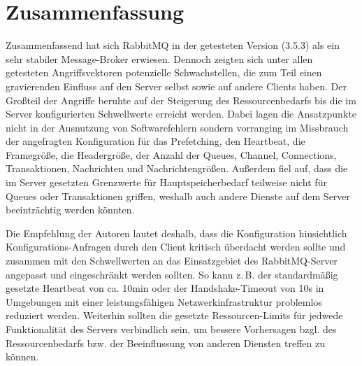 \documentclass[	a4paper,
			11pt,
			oneside,
			parskip]{scrartcl}
\begin{document}
\clearpage
\section*{Zusammenfassung}

	Zusammenfassend hat sich RabbitMQ in der getesteten Version (3.5.3) als ein sehr stabiler Message-Broker erwiesen. Dennoch zeigten sich unter allen getesteten Angriffsvektoren potenzielle Schwachstellen,
	die zum Teil einen gravierenden Einfluss auf den Server selbst sowie auf andere Clients haben. Der Großteil der Angriffe beruhte auf der Steigerung des Ressourcenbedarfs bis die im Server konfigurierten
	Schwellwerte erreicht werden. Dabei lagen die Ansatzpunkte nicht in der Ausnutzung von Softwarefehlern sondern vorranging im Missbrauch der angefragten Konfiguration für das Prefetching, den Heartbeat,
	die Framegröße, die Headergröße, der Anzahl der Queues, Channel, Connections, Transaktionen, Nachrichten und Nachrichtengrößen. Außerdem fiel auf, dass die im Server gesetzten Grenzwerte für Hauptspeicherbedarf teilweise nicht für Queues oder Transaktionen griffen, weshalb auch andere Dienste auf dem Server beeinträchtig werden könnten.
	
	Die Empfehlung der Autoren lautet deshalb, dass die Konfiguration hinsichtlich Konfigurations-Anfragen durch den Client kritisch überdacht werden sollte und zusammen mit den Schwellwerten an das 
	Einsatzgebiet des RabbitMQ-Server angepasst und eingeschränkt werden sollten. So kann z.\,B. der standardmäßig gesetzte Heartbeat von ca. 10min oder der Handshake-Timeout von 10s in Umgebungen
	mit einer leistungsfähigen Netzwerkinfrastruktur problemlos reduziert werden. Weiterhin sollten die gesetzte Ressourcen-Limits für jedwede Funktionalität des Servers verbindlich sein, um bessere
	Vorhersagen bzgl. des Ressourcenbedarfs bzw. der Beeinflussung von anderen Diensten treffen zu können.
\end{document}
